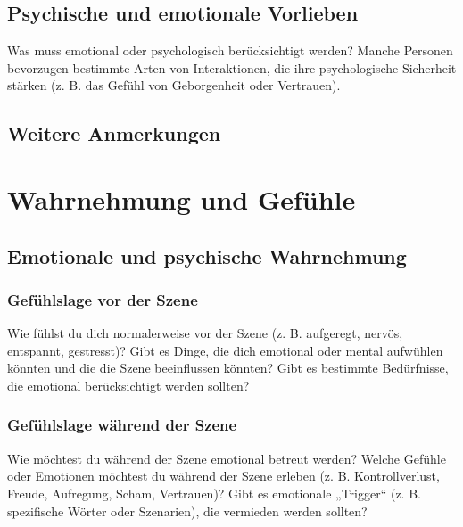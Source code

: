 \documentclass[a4paper,12pt]{article}
\begin{document}
\newpage
\subsection{Psychische und emotionale Vorlieben}
\noindent Was muss emotional oder psychologisch berücksichtigt werden? Manche Personen bevorzugen bestimmte Arten von Interaktionen, die ihre psychologische Sicherheit stärken (z. B. das Gefühl von Geborgenheit oder Vertrauen).\newline
\noindent \TextField[name=WuenschePsych,multiline=true,height=20em, width=37em]{}
    
\subsection{Weitere Anmerkungen}
\noindent \TextField[name=WuenscheWeiteres,multiline=true,height=20em, width=37em]{}


\newpage
\section{Wahrnehmung und Gefühle}
\subsection{Emotionale und psychische Wahrnehmung}
\subsubsection{Gefühlslage vor der Szene}
\noindent Wie fühlst du dich normalerweise vor der Szene (z. B. aufgeregt, nervös, entspannt, gestresst)? Gibt es Dinge, die dich emotional oder mental aufwühlen könnten und die die Szene beeinflussen könnten? Gibt es bestimmte Bedürfnisse, die emotional berücksichtigt werden sollten? \newline
\noindent \TextField[name=WahrVor,multiline=true,height=10em, width=37em]{}

\subsubsection{Gefühlslage während der Szene}
\noindent Wie möchtest du während der Szene emotional betreut werden? Welche Gefühle oder Emotionen möchtest du während der Szene erleben (z. B. Kontrollverlust, Freude, Aufregung, Scham, Vertrauen)? Gibt es emotionale „Trigger“ (z. B. spezifische Wörter oder Szenarien), die vermieden werden sollten?\newline
\noindent \TextField[name=WahrWae,multiline=true,height=10em, width=37em]{}
\end{document}
